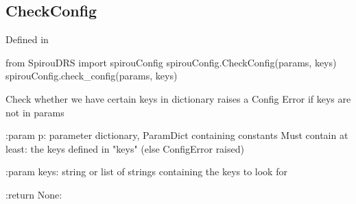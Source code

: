 \begin{minipage}{\textwidth}
\subsection{CheckConfig}

Defined in \spirouConfig{}

\begin{pythonbox}
from SpirouDRS import spirouConfig
spirouConfig.CheckConfig(params, keys)
spirouConfig.check_config(params, keys)
\end{pythonbox}

\begin{pythondocstring}
Check whether we have certain keys in dictionary
raises a Config Error if keys are not in params

:param p: parameter dictionary, ParamDict containing constants
    Must contain at least:
        the keys defined in "keys" (else ConfigError raised)

:param keys: string or list of strings containing the keys to look for

:return None:
\end{pythondocstring}
\end{minipage}

